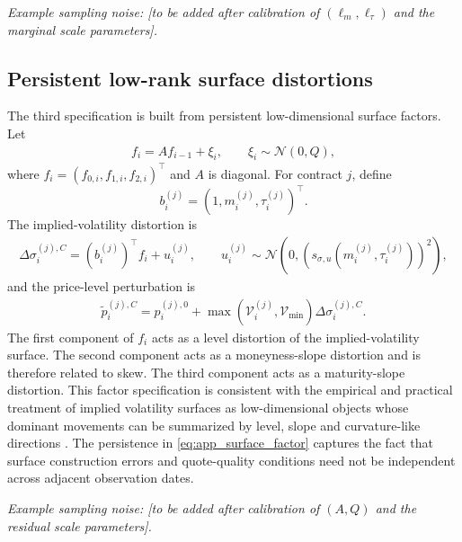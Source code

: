 \documentclass[11pt,a4paper,notitlepage]{article}
\numberwithin{equation}{section}
\begin{document}
\emph{Example sampling noise: [to be added after calibration of $(\ell_m,\ell_\tau)$ and the marginal scale parameters].}

\subsection{Persistent low-rank surface distortions}
The third specification is built from persistent low-dimensional surface factors. Let
\begin{align}
f_i=A f_{i-1}+\xi_i,
\qquad
\xi_i\sim\mathcal{N}(0,Q),
\label{eq:app_surface_factor}
\end{align}
where $f_i=(f_{0,i},f_{1,i},f_{2,i})^\top$ and $A$ is diagonal. For contract $j$, define
\[
b_i^{(j)}=(1,m_i^{(j)},\tau_i^{(j)})^\top.
\]
The implied-volatility distortion is
\begin{align}
\Delta\sigma_i^{(j),C}
=
\left(b_i^{(j)}\right)^\top f_i + u_i^{(j)},
\qquad
u_i^{(j)}\sim\mathcal{N}\left(0,\left(s_{\sigma,u}(m_i^{(j)},\tau_i^{(j)})\right)^2\right),
\label{eq:app_factor_iv_noise}
\end{align}
and the price-level perturbation is
\begin{align}
\tilde p_i^{(j),C}
=
p_i^{(j),0}
+
\max\left(\mathcal{V}_i^{(j)},\mathcal{V}_{\min}\right)
\Delta\sigma_i^{(j),C}.
\label{eq:app_factor_price_noise}
\end{align}
The first component of $f_i$ acts as a level distortion of the implied-volatility surface. The second component
acts as a moneyness-slope distortion and is therefore related to skew. The third component acts as a maturity-slope
distortion. This factor specification is consistent with the empirical and practical treatment of implied volatility
surfaces as low-dimensional objects whose dominant movements can be summarized by level, slope and curvature-like
directions \citep{cont2002dynamics}. The persistence in \eqref{eq:app_surface_factor} captures the fact that surface
construction errors and quote-quality conditions need not be independent across adjacent observation dates.

\emph{Example sampling noise: [to be added after calibration of $(A,Q)$ and the residual scale parameters].}
\end{document}
